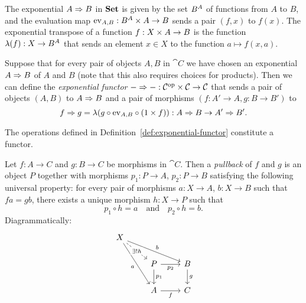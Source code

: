 \begin{ex} \label{ex:set-exponentials}
The exponential $\cexp{A}{B}$ in $\Set$ is given by the set $\funcset{A}{B}$ of functions from $A$ to $B$, and the evaluation map $\mev[A,B] : \cartprod{\funcset{A}{B}}{A} \to B$ sends a pair $(f, x)$ to $f(x)$. The exponential transpose of a function $f : \cartprod{X}{A} \to B$ is the function $\mcurry{f} : X \to \funcset{A}{B}$ that sends an element $x \in X$ to the function $a \mapsto f(x, a)$.
\end{ex}

\begin{defn} \label{def:exponential-functor}
Suppose that for every pair of objects $A, B$ in $\cat{C}$ we have chosen an exponential $\cexp{A}{B}$ of $A$ and $B$ (note that this also requires choices for products). Then we can define the \emph{exponential functor} $\cexp{-}{-} : \prodcat{\op{\cat{C}}}{\cat{C}} \to \cat{C}$ that sends a pair of objects $(A,B)$ to $\cexp{A}{B}$ and a pair of morphisms $(f : A' \to A, g : B \to B')$ to
\[ \cexp{f}{g} = \mcurry{g \circ \mev[A,B] \circ (\cprod{\id}{f})}
    : \cexp{A}{B} \to \cexp{A'}{B'}. \]
\end{defn}
\begin{prop}
The operations defined in Definition~\ref{def:exponential-functor} constitute a functor.
\end{prop}

\begin{defn}
Let $f : A \to C$ and $g : B \to C$ be morphisms in $\cat{C}$. Then a \emph{pullback} of $f$ and $g$ is an object $P$ together with morphisms $p_1 : P \to A$, $p_2 : P \to B$ satisfying the following universal property: for every pair of morphisms $a : X \to A$, $b : X \to B$ such that $fa = gb$, there exists a unique morphism $h : X \to P$ such that 
\[ p_1 \circ h = a \quad\text{and}\quad p_2 \circ h = b. \]
Diagrammatically:
\[\begin{tikzcd}
	X \\
	& P & B \\
	& A & C
	\arrow["g", from=2-3, to=3-3]
	\arrow["f"', from=3-2, to=3-3]
	\arrow["{p_1}", from=2-2, to=3-2]
	\arrow["a"', from=1-1, to=3-2]
	\arrow["{p_2}"', from=2-2, to=2-3]
	\arrow["b", from=1-1, to=2-3]
	\arrow["{\exists! h}"{description}, dashed, from=1-1, to=2-2]
\end{tikzcd}\]
\end{defn}

